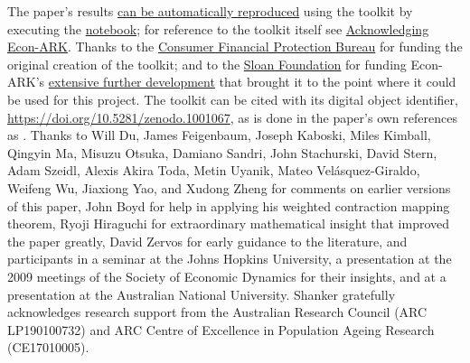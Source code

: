 \documentclass[BufferStockTheory]{subfiles}
\begin{document}
\hypersetup{pageanchor=false}  %
  \begin{minipage}{0.9\textwidth} 
    \footnotesize The paper's results \href{https://\owner.github.io/nbreproduce}{can be automatically reproduced} using the {\ARKurl} toolkit by executing the \href{https://econ-ark.org/materials/bufferstocktheory}{notebook}; for reference to the toolkit itself see \href{https://econ-ark.org/acknowledging}{Acknowledging Econ-ARK}.  Thanks to the \href{https://consumerfinance.gov}{Consumer Financial Protection Bureau} for funding the original creation of the {\ARKurl} toolkit; and to the \href{https://sloan.org}{Sloan Foundation} for funding Econ-ARK's \href{https://sloan.org/grant-detail/8071}{extensive further development} that brought it to the point where it could be used for this project.  The toolkit can be cited with its digital object identifier, \href{https://doi.org/10.5281/zenodo.1001067}{https://doi.org/10.5281/zenodo.1001067}, as is done in the paper's own references as \cite{carroll_et_al-proc-scipy-2018}.  Thanks to Will Du, James Feigenbaum, Joseph Kaboski, Miles Kimball, Qingyin Ma, Misuzu Otsuka, Damiano Sandri, John Stachurski, David Stern, Adam Szeidl, Alexis Akira Toda, Metin Uyanik, Mateo Vel\'asquez-Giraldo, Weifeng Wu,  Jiaxiong Yao, and Xudong Zheng for comments on earlier versions of this paper, John Boyd for help in applying his weighted contraction mapping theorem, Ryoji  Hiraguchi for extraordinary mathematical insight that improved the  paper greatly, David Zervos for early guidance to the literature, and participants in a seminar at the Johns Hopkins University, a presentation at the 2009 meetings of the Society of Economic Dynamics for their insights, and at a presentation at the Australian National University. Shanker gratefully acknowledges research support from the Australian Research Council (ARC LP190100732) and ARC Centre of Excellence in Population Ageing Research (CE17010005). 
  \end{minipage} 

  \titlepagefinish\pagebreak
  \let\LaTeXStandardContentsName\contentsname
  \renewcommand{\contentsname}{}
  \tableofcontents
  \pagebreak
  \medskip\medskip
  \begin{minipage}{0.9\textwidth}
    \listoffigures 
  \end{minipage}
\end{document}

